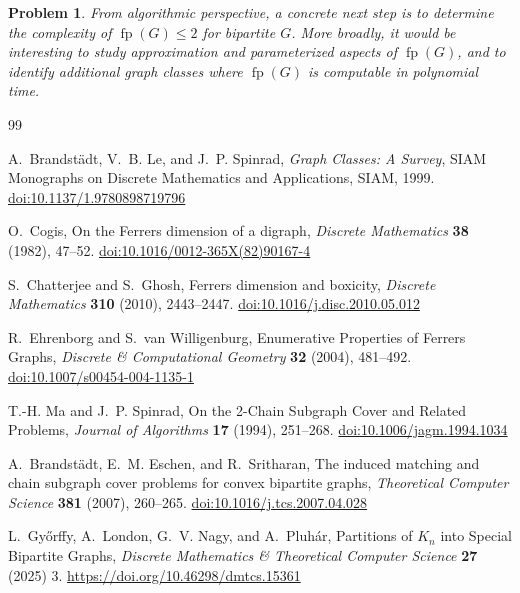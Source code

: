 \documentclass[12pt]{amsart}
\newtheorem{problem}[theorem]{Problem}
\newcommand{\fp}{\operatorname{fp}}
\begin{document}
\begin{problem}
From algorithmic perspective, a concrete next step is to determine the complexity of $\fp(G)\le 2$ for bipartite $G$. More broadly, it would be interesting to study approximation and parameterized aspects of $\fp(G)$, and to identify additional graph classes where $\fp(G)$ is computable in polynomial time.
\end{problem}



\begin{thebibliography}{99}

A.~Brandst{\"a}dt, V.~B. Le, and J.~P. Spinrad,
\newblock \emph{Graph Classes: A Survey},
\newblock SIAM Monographs on Discrete Mathematics and Applications, SIAM, 1999.
\newblock \href{https://doi.org/10.1137/1.9780898719796}{doi:10.1137/1.9780898719796}

O.~Cogis,
\newblock On the Ferrers dimension of a digraph,
\newblock \emph{Discrete Mathematics} \textbf{38} (1982), 47--52.
\newblock \href{https://doi.org/10.1016/0012-365X(82)90167-4}{doi:10.1016/0012-365X(82)90167-4}

S.~Chatterjee and S.~Ghosh,
\newblock Ferrers dimension and boxicity,
\newblock \emph{Discrete Mathematics} \textbf{310} (2010), 2443--2447.
\newblock \href{https://doi.org/10.1016/j.disc.2010.05.012}{doi:10.1016/j.disc.2010.05.012}

R.~Ehrenborg and S.~van Willigenburg,
\newblock Enumerative Properties of Ferrers Graphs,
\newblock \emph{Discrete \& Computational Geometry} \textbf{32} (2004), 481--492.
\newblock \href{https://doi.org/10.1007/s00454-004-1135-1}{doi:10.1007/s00454-004-1135-1}

T.-H. Ma and J.~P. Spinrad,
\newblock On the 2-Chain Subgraph Cover and Related Problems,
\newblock \emph{Journal of Algorithms} \textbf{17} (1994), 251--268.
\newblock \href{https://doi.org/10.1006/jagm.1994.1034}{doi:10.1006/jagm.1994.1034}

A.~Brandst{\"a}dt, E.~M. Eschen, and R.~Sritharan,
\newblock The induced matching and chain subgraph cover problems for convex bipartite graphs,
\newblock \emph{Theoretical Computer Science} \textbf{381} (2007), 260--265.
\newblock \href{https://doi.org/10.1016/j.tcs.2007.04.028}{doi:10.1016/j.tcs.2007.04.028}


L.~Gy\H{o}rffy, A.~London, G.~V. Nagy, and A.~Pluh{\'a}r,
\newblock Partitions of $K_n$ into Special Bipartite Graphs,
\newblock \emph{Discrete Mathematics \& Theoretical Computer Science} \textbf{27} (2025) 3.
\newblock \href{https://doi.org/10.46298/dmtcs.15361}{https://doi.org/10.46298/dmtcs.15361}


\end{thebibliography}
\end{document}

